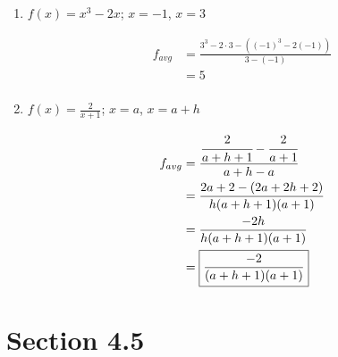 \documentclass{exam}
\begin{document}
    \begin{enumerate}
      \item $f(x) = x^3 - 2x$; $x = -1$, $x = 3$
        \begin{solution}
          \begin{align*}
            f_{avg} &= \frac{3^3 - 2 \cdot 3 - \left( (-1)^3 - 2(-1) \right)}{3 - (-1)} \\
                    &= \boxed{5} \\
          \end{align*}
        \end{solution}

      \item $f(x) = \frac{2}{x + 1}$; $x = a$, $x = a + h$
        \begin{solution}
          \begin{align*}
            f_{avg} &= \cfrac{\cfrac{2}{a + h + 1} - \cfrac{2}{a + 1}}{a + h - a} \\
                    &= \frac{2a + 2 - (2a + 2h + 2)}{h(a + h + 1)(a + 1)} \\
                    &= \frac{-2h}{h(a + h + 1)(a + 1)} \\
                    &= \boxed{ \frac{-2}{(a + h + 1)(a + 1)} } \\
          \end{align*}
        \end{solution}

    \end{enumerate}

  \ifprintanswers

    \pagebreak

    \section{Section 4.5}
\end{document}
